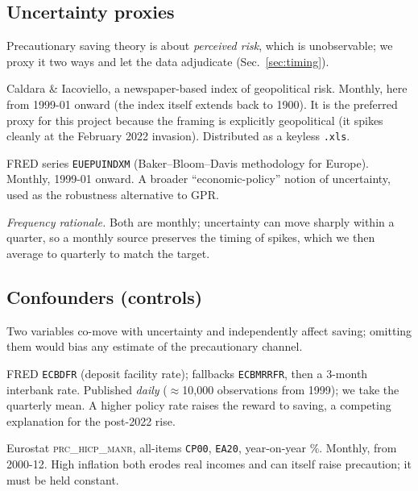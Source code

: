 \documentclass[11pt,a4paper]{article}
\newcommand{\code}[1]{\texttt{#1}}
\newcommand{\dataset}[1]{\textsc{#1}}
\begin{document}
\subsection{Uncertainty proxies}
Precautionary saving theory is about \emph{perceived risk}, which is
unobservable; we proxy it two ways and let the data adjudicate
(Sec.~\ref{sec:timing}).
\begin{description}[leftmargin=1.4em,style=nextline]
\item[Geopolitical Risk (GPR)] Caldara \& Iacoviello, a newspaper-based index of
  geopolitical risk. Monthly, here from 1999-01 onward (the index itself extends
  back to 1900). It is the preferred proxy for this project because the framing
  is explicitly geopolitical (it spikes cleanly at the February 2022 invasion).
  Distributed as a keyless \code{.xls}.
\item[EU Economic Policy Uncertainty (EPU)] FRED series \code{EUEPUINDXM}
  (Baker--Bloom--Davis methodology for Europe). Monthly, 1999-01 onward. A
  broader ``economic-policy'' notion of uncertainty, used as the robustness
  alternative to GPR.
\end{description}
\emph{Frequency rationale.} Both are monthly; uncertainty can move sharply
within a quarter, so a monthly source preserves the timing of spikes, which we
then average to quarterly to match the target.

\subsection{Confounders (controls)}
Two variables co-move with uncertainty and independently affect saving; omitting
them would bias any estimate of the precautionary channel.
\begin{description}[leftmargin=1.4em,style=nextline]
\item[ECB policy rate] FRED \code{ECBDFR} (deposit facility rate); fallbacks
  \code{ECBMRRFR}, then a 3-month interbank rate. Published \emph{daily}
  ($\approx$10{,}000 observations from 1999); we take the quarterly mean. A higher
  policy rate raises the reward to saving, a competing explanation for the
  post-2022 rise.
\item[HICP inflation] Eurostat \dataset{prc\_hicp\_manr}, all-items \code{CP00},
  \code{EA20}, year-on-year \%. Monthly, from 2000-12. High inflation both erodes
  real incomes and can itself raise precaution; it must be held constant.
\end{description}
\end{document}
